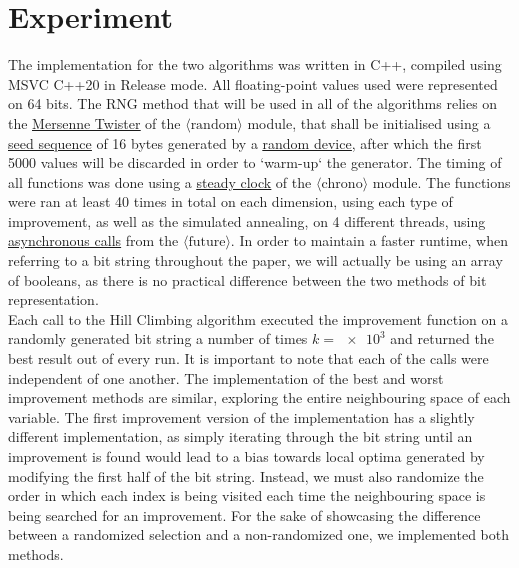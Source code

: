 \documentclass{article}
\begin{document}
\section{Experiment}
The implementation for the two algorithms was written in C++, compiled using MSVC C++20 in Release mode. All floating-point values used were represented on 64 bits. The RNG method that will be used in all of the algorithms relies on the \underline{\href{https://cplusplus.com/reference/random/mt19937/}{Mersenne Twister}} of the $\langle\text{random}\rangle$ module, that shall be initialised using a \underline{\href{https://en.cppreference.com/w/cpp/numeric/random/seed_seq}{seed sequence}} of 16 bytes generated by a \underline{\href{https://en.cppreference.com/w/cpp/numeric/random/random_device}{random device}}, after which the first 5000 values will be discarded in order to `warm-up` the generator. The timing of all functions was done using a \underline{\href{https://en.cppreference.com/w/cpp/chrono/steady_clock}{steady clock}} of the $\langle\text{chrono}\rangle$ module. The functions were ran at least 40 times in total on each dimension, using each type of improvement, as well as the simulated annealing, on 4 different threads, using \underline{\href{https://en.cppreference.com/w/cpp/thread/async}{asynchronous calls}} from the $\langle\text{future}\rangle$. In order to maintain a faster runtime, when referring to a bit string throughout the paper, we will actually be using an array of booleans, as there is no practical difference between the two methods of bit representation.\\
Each call to the Hill Climbing algorithm executed the improvement function on a randomly generated bit string a number of times $k = \num{e3}$ and returned the best result out of every run. It is important to note that each of the calls were independent of one another. The implementation of the best and worst improvement methods are similar, exploring the entire neighbouring space of each variable. The first improvement version of the implementation has a slightly different implementation, as simply iterating through the bit string until an improvement is found would lead to a bias towards local optima generated by modifying the first half of the bit string. Instead, we must also randomize the order in which each index is being visited each time the neighbouring space is being searched for an improvement. For the sake of showcasing the difference between a randomized selection and a non-randomized one, we implemented both methods.\\
\end{document}
